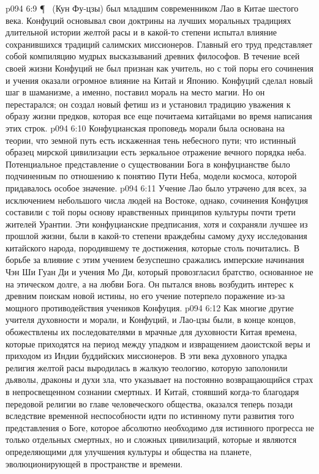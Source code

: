 \vs p094 6:9 \P\  (Кун Фу\hyp{}цзы) был младшим современником Лао в Китае шестого века. Конфуций основывал свои доктрины на лучших моральных традициях длительной истории желтой расы и в какой\hyp{}то степени испытал влияние сохранившихся традиций салимских миссионеров. Главный его труд представляет собой компиляцию мудрых высказываний древних философов. В течение всей своей жизни Конфуций не был признан как учитель, но с той поры его сочинения и учения оказали огромное влияние на Китай и Японию. Конфуций сделал новый шаг в шаманизме, а именно, поставил мораль на место магии. Но он перестарался; он создал новый фетиш из  и установил традицию уважения к образу жизни предков, которая все еще почитаема китайцами во время написания этих строк.
\vs p094 6:10 Конфуцианская проповедь морали была основана на теории, что земной путь есть искаженная тень небесного пути; что истинный образец мирской цивилизации есть зеркальное отражение вечного порядка неба. Потенциальное представление о существовании Бога в конфуцианстве было подчиненным по отношению к понятию Пути Неба, модели космоса, которой придавалось особое значение.
\vs p094 6:11 Учение Лао было утрачено для всех, за исключением небольшого числа людей на Востоке, однако, сочинения Конфуция составили с той поры основу нравственных принципов культуры почти трети жителей Урантии. Эти конфуцианские предписания, хотя и сохраняли лучшее из прошлой жизни, были в какой\hyp{}то степени враждебны самому духу исследования китайского народа, породившему те достижения, которые столь почитались. В борьбе за влияние с этим учением безуспешно сражались имперские начинания Чэн Ши Гуан Ди и учения Мо Ди, который провозгласил братство, основанное не на этическом долге, а на любви Бога. Он пытался вновь возбудить интерес к древним поискам новой истины, но его учение потерпело поражение из\hyp{}за мощного противодействия учеников Конфуция.
\vs p094 6:12 Как многие другие учителя духовности и морали, и Конфуций, и Лао\hyp{}цзы были, в конце концов, обожествлены их последователями в мрачные для духовности Китая времена, которые приходятся на период между упадком и извращением даоистской веры и приходом из Индии буддийских миссионеров. В эти века духовного упадка религия желтой расы выродилась в жалкую теологию, которую заполонили дьяволы, драконы и духи зла, что указывает на постоянно возвращающийся страх в непросвещенном сознании смертных. И Китай, стоявший когда\hyp{}то благодаря передовой религии во главе человеческого общества, оказался теперь позади вследствие временной неспособности идти по истинному пути развития того представления о Боге, которое абсолютно необходимо для истинного прогресса не только отдельных смертных, но и сложных цивилизаций, которые и являются определяющими для улучшения культуры и общества на планете, эволюционирующей в пространстве и времени.

